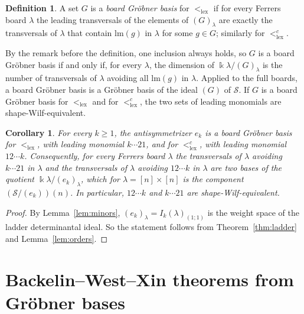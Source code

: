 \documentclass[11pt]{amsart}
\newtheorem{corollary}[theorem]{Corollary}
\theoremstyle{definition}
\newtheorem{definition}[theorem]{Definition}
\theoremstyle{remark}
\newcommand{\kk}{\Bbbk}
\newcommand{\lm}{\mathrm{lm}}
\newcommand{\cS}{\mathscr{S}}
\newcommand{\lex}{\mathrm{lex}}
\begin{document}
\begin{definition}\label{def:board-gb}
A set $G$ is a \emph{board Gr\"obner basis} for $<_\lex$ if for every Ferrers board $\lambda$ the leading transversals of the elements of $(G)_\lambda$ are exactly the transversals of $\lambda$ that contain $\lm(g)$ in $\lambda$ for some $g\in G$; similarly for $<_\lex^c$.
\end{definition}

By the remark before the definition, one inclusion always holds, so $G$ is a board Gr\"obner basis if and only if, for every $\lambda$, the dimension of $\kk\lambda/(G)_\lambda$ is the number of transversals of $\lambda$ avoiding all $\lm(g)$ in $\lambda$. Applied to the full boards, a board Gr\"obner basis is a Gr\"obner basis of the ideal $(G)$ of $\cS$. If $G$ is a board Gr\"obner basis for $<_\lex$ and for $<_\lex^c$, the two sets of leading monomials are shape-Wilf-equivalent.

\begin{corollary}\label{cor:shape-wilf}
For every $k\ge1$, the antisymmetrizer $e_k$ is a board Gr\"obner basis for $<_\lex$, with leading monomial $k\cdots21$, and for $<_\lex^c$, with leading monomial $12\cdots k$. Consequently, for every Ferrers board $\lambda$ the transversals of $\lambda$ avoiding $k\cdots21$ in $\lambda$ and the transversals of $\lambda$ avoiding $12\cdots k$ in $\lambda$ are two bases of the quotient $\kk\lambda/(e_k)_\lambda$, which for $\lambda=[n]\times[n]$ is the component $(\cS/(e_k))(n)$. In particular, $12\cdots k$ and $k\cdots21$ are shape-Wilf-equivalent.
\end{corollary}

\begin{proof}
By Lemma~\ref{lem:minors}, $(e_k)_\lambda=I_k(\lambda)_{(1;1)}$ is the weight space of the ladder determinantal ideal. So the statement follows from Theorem~\ref{thm:ladder} and Lemma~\ref{lem:orders}.
\end{proof}

\section{Backelin--West--Xin theorems from Gr\"obner bases}\label{sec:BWX}
\end{document}
